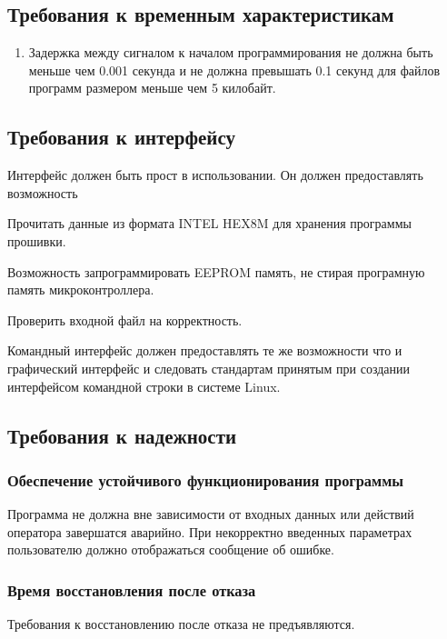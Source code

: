\subsection{Требования к временным характеристикам}
\begin{enumerate}
\item Задержка между сигналом к началом программирования не должна быть меньше чем 0.001 секунда и не должна превышать 0.1 секунд для файлов программ размером меньше чем 5 килобайт.
\end{enumerate}


\subsection{Требования к интерфейсу}
Интерфейс должен быть прост в использовании. Он должен предоставлять возможность
\begin{my_enumerate}
\item Прочитать данные из формата INTEL HEX8M для хранения программы прошивки.
\item Возможность запрограммировать EEPROM память, не стирая програмную память микроконтроллера.
\item Проверить входной файл на корректность.
\end{my_enumerate}

Командный интерфейс должен предоставлять те же возможности что и графический интерфейс и следовать стандартам принятым при создании интерфейсом командной строки в системе Linux.

\subsection{Требования к надежности}
\subsubsection{Обеспечение устойчивого функционирования программы}
Программа не должна вне зависимости от входных данных или действий оператора завершатся аварийно. При некорректно введенных параметрах пользователю должно отображаться сообщение об ошибке.
\subsubsection{Время восстановления после отказа}
Требования к восстановлению после отказа не предъявляются.
